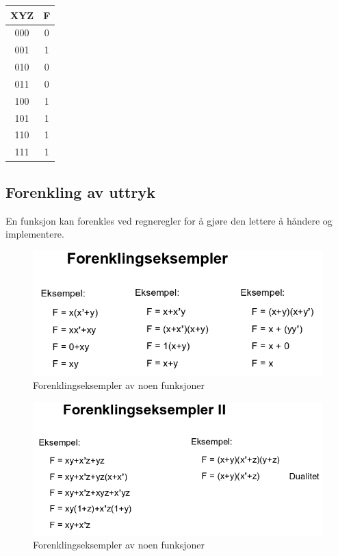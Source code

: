 \documentclass{article}
\begin{document}
		\begin{center}
			\begin{tabular}{|c|c|}
				\hline
				XYZ & F \\ \hline
				000 & 0  \\ \hline
				001 & 1  \\ \hline 
				010 & 0  \\ \hline
				011 & 0  \\ \hline 
				100 & 1  \\ \hline
				101 & 1  \\ \hline
				110 & 1  \\ \hline
				111 & 1  \\ \hline
				
			\end{tabular}
		\end{center}
	
	
	\subsection*{Forenkling av uttryk}
	En funksjon kan forenkles ved regneregler for å gjøre den lettere å håndere og implementere.
	
	\begin{figure}[H]
		\includegraphics[scale=0.6]{Forenkling.png}
		\caption{Forenklingseksempler av noen funksjoner}
	\end{figure}
	
	\begin{figure}[H]
		\includegraphics[scale=0.6]{Forenkling2.png}
		\caption{Forenklingseksempler av noen funksjoner}
	\end{figure}
	
\end{document}
